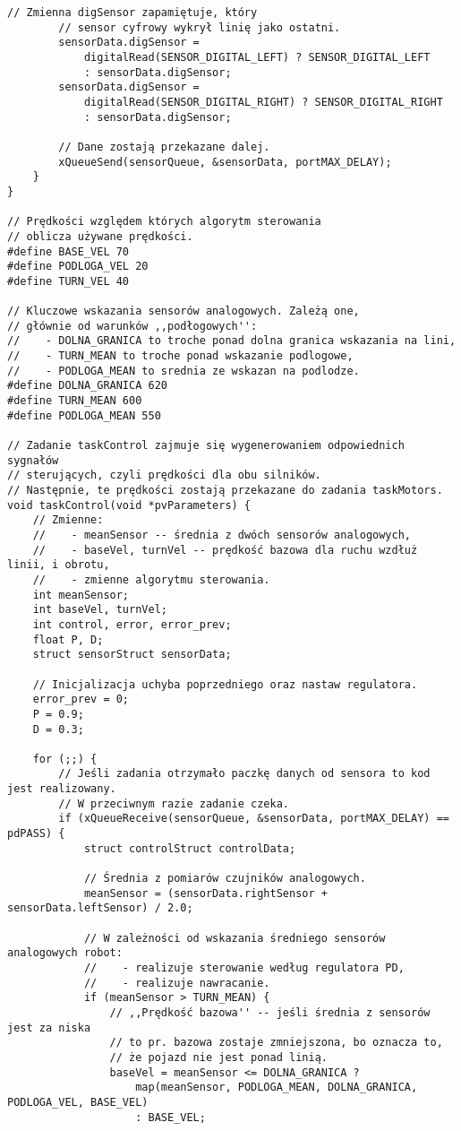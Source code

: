 \documentclass[11pt]{article}
\begin{document}
\begin{appendices}
\begin{lstlisting}[basicstyle = \ttfamily \footnotesize]
        // Zmienna digSensor zapamiętuje, który
        // sensor cyfrowy wykrył linię jako ostatni.
        sensorData.digSensor =
            digitalRead(SENSOR_DIGITAL_LEFT) ? SENSOR_DIGITAL_LEFT
            : sensorData.digSensor;
        sensorData.digSensor =
            digitalRead(SENSOR_DIGITAL_RIGHT) ? SENSOR_DIGITAL_RIGHT
            : sensorData.digSensor;

        // Dane zostają przekazane dalej.
        xQueueSend(sensorQueue, &sensorData, portMAX_DELAY);
    }
}

// Prędkości względem których algorytm sterowania
// oblicza używane prędkości.
#define BASE_VEL 70
#define PODLOGA_VEL 20
#define TURN_VEL 40

// Kluczowe wskazania sensorów analogowych. Zależą one,
// głównie od warunków ,,podłogowych'':
//    - DOLNA_GRANICA to troche ponad dolna granica wskazania na lini,
//    - TURN_MEAN to troche ponad wskazanie podlogowe,
//    - PODLOGA_MEAN to srednia ze wskazan na podlodze.
#define DOLNA_GRANICA 620
#define TURN_MEAN 600
#define PODLOGA_MEAN 550

// Zadanie taskControl zajmuje się wygenerowaniem odpowiednich sygnałów
// sterujących, czyli prędkości dla obu silników.
// Następnie, te prędkości zostają przekazane do zadania taskMotors.
void taskControl(void *pvParameters) {
    // Zmienne:
    //    - meanSensor -- średnia z dwóch sensorów analogowych,
    //    - baseVel, turnVel -- prędkość bazowa dla ruchu wzdłuż linii, i obrotu,
    //    - zmienne algorytmu sterowania.
    int meanSensor;
    int baseVel, turnVel;
    int control, error, error_prev;
    float P, D;
    struct sensorStruct sensorData;

    // Inicjalizacja uchyba poprzedniego oraz nastaw regulatora.
    error_prev = 0;
    P = 0.9;
    D = 0.3;

    for (;;) {
        // Jeśli zadania otrzymało paczkę danych od sensora to kod jest realizowany.
        // W przeciwnym razie zadanie czeka.
        if (xQueueReceive(sensorQueue, &sensorData, portMAX_DELAY) == pdPASS) {
            struct controlStruct controlData;

            // Średnia z pomiarów czujników analogowych.
            meanSensor = (sensorData.rightSensor + sensorData.leftSensor) / 2.0;

            // W zależności od wskazania średniego sensorów analogowych robot:
            //    - realizuje sterowanie według regulatora PD,
            //    - realizuje nawracanie.
            if (meanSensor > TURN_MEAN) {
                // ,,Prędkość bazowa'' -- jeśli średnia z sensorów jest za niska
                // to pr. bazowa zostaje zmniejszona, bo oznacza to,
                // że pojazd nie jest ponad linią.
                baseVel = meanSensor <= DOLNA_GRANICA ?
                    map(meanSensor, PODLOGA_MEAN, DOLNA_GRANICA, PODLOGA_VEL, BASE_VEL)
                    : BASE_VEL;


\end{lstlisting}
\end{appendices}
\end{document}
